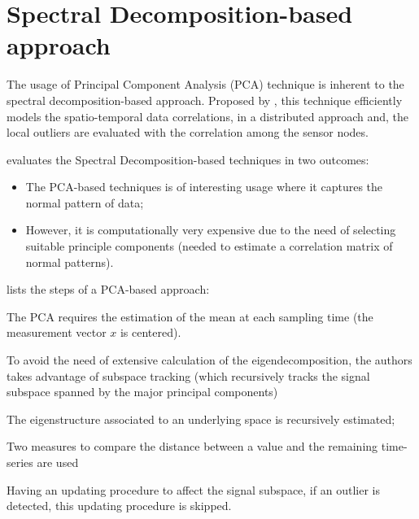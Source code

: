 \newpage
\section{Spectral Decomposition-based approach}
\label{sec:specbased}

The usage of Principal Component Analysis (PCA) technique is inherent to the spectral decomposition-based approach. Proposed by \cite{spect:chatzigiannakis:2006}, this technique efficiently models the spatio-temporal data correlations, in a distributed approach and, the local outliers are evaluated with the correlation among the sensor nodes.


\cite{gen:zhang:2010} evaluates the Spectral Decomposition-based techniques in two outcomes: 
\begin{itemize}
	
	\setlength\itemsep{-0.5em}
	
	\item The PCA-based techniques is of interesting usage where it captures the normal pattern of data;
	\item However, it is computationally very expensive due to the need of selecting suitable principle components (needed to estimate a correlation matrix of normal patterns).
	
\end{itemize}

\cite{class:gil:2016} lists the steps of a PCA-based approach: 
\begin{description}
	
	\setlength\itemsep{-0.5em}
	
	\item [Robust recursive location estimator]
	The PCA requires the estimation of the mean at each sampling time (the measurement vector $x$ is centered).
	\item [Subspace tracking approach]
	To avoid the need of extensive calculation of the eigendecomposition, the authors takes advantage of subspace tracking (which recursively tracks the signal subspace spanned by the major principal components)
	\item [Recursive eigendecomposition computation]
	The eigenstructure associated to an underlying space is recursively estimated;
	
	\item [Robust recursive detection criteria] 
	Two measures to compare the distance between a value and the remaining time-series are used
	\item [Robust subspace tracking]
	Having an updating procedure to affect the signal subspace, if an outlier is detected, this updating procedure is skipped.
	
\end{description}